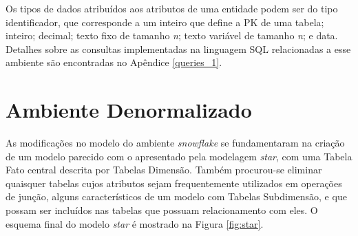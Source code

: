 Os tipos de dados atribuídos aos atributos de uma entidade podem ser do tipo identificador, que corresponde a um inteiro que define a PK de uma tabela; inteiro; decimal; texto fixo de tamanho \textit{n}; texto variável de tamanho \textit{n}; e data. Detalhes sobre as consultas implementadas na linguagem SQL relacionadas a esse ambiente são encontradas no Apêndice \ref{queries_1}.

\section{Ambiente Denormalizado}

As modificações no modelo do ambiente \textit{snowflake} se fundamentaram na criação de um modelo parecido com o apresentado pela modelagem \textit{star}, com uma Tabela Fato central descrita por Tabelas Dimensão. Também procurou-se eliminar quaisquer tabelas cujos atributos sejam frequentemente utilizados em operações de junção, alguns característicos de um modelo com Tabelas Subdimensão, e que possam ser incluídos nas tabelas que possuam relacionamento com eles. O esquema final do modelo \textit{star} é mostrado na Figura \ref{fig:star}.

